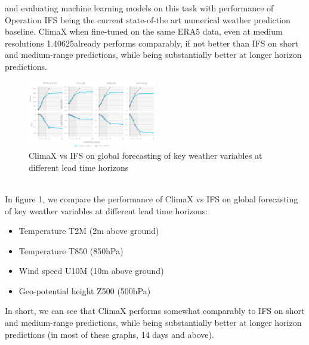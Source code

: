 \documentclass[../paper.tex]{subfiles}
\begin{document}
            and evaluating machine learning models on this task with performance of Operation
            IFS being the current state-of-the art numerical weather prediction baseline.
            ClimaX when fine-tuned on the same ERA5 data,
            even at medium resolutions 1.40625\textdegree already performs comparably,
            if not better than IFS on short and medium-range predictions,
            while being substantially better at longer horizon predictions\cite{d1}.
            \begin{figure}[h]
            \centering
            \includegraphics[width=0.5\textwidth]{../photos/climax_ifs}
            \caption{ClimaX vs IFS on global forecasting of key weather variables at different lead time horizons}
            \label{fig:climax-vs-ifs}
            \end{figure}\\
            In figure 1,
            we compare the performance of ClimaX vs IFS on global forecasting of key weather variables at different lead time horizons:
            \begin{itemize}
                \item Temperature T2M (2m above ground)
                \item Temperature T850 (850hPa)
                \item Wind speed U10M (10m above ground)
                \item Geo-potential height Z500 (500hPa)
            \end{itemize}
            In short, we can see that ClimaX performs somewhat comparably to IFS on short and medium-range predictions,
            while being substantially better at longer horizon predictions (in most of these graphs, 14 days and above).\\
\end{document}
